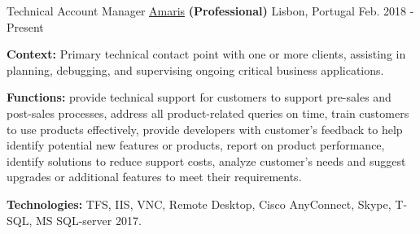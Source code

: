 \begin{cventries}


  \cventry
    {Technical Account Manager} %
    {\href{https://www.amaris.com/}{Amaris} \textbf{(Professional)}} %
    {Lisbon, Portugal} %
    {Feb. 2018 - Present} %
    {
      \begin{cvitems} %
		\item {\textbf{Context:} Primary technical contact point with one or more clients, assisting in planning, debugging, and supervising ongoing critical business applications.}
		\item {\textbf{Functions:} provide technical support for customers to support pre-sales and post-sales processes, address all product-related queries on time, train customers to use products effectively, provide developers with customer's feedback to help identify potential new features or products, report on product performance, identify solutions to reduce support costs, analyze customer's needs and suggest upgrades or additional features to meet their requirements.}		
		\item {\textbf{Technologies:} TFS, IIS, VNC, Remote Desktop, Cisco AnyConnect, Skype, T-SQL, MS SQL-server 2017.}
      \end{cvitems}
    } 
    

\end{cventries}
